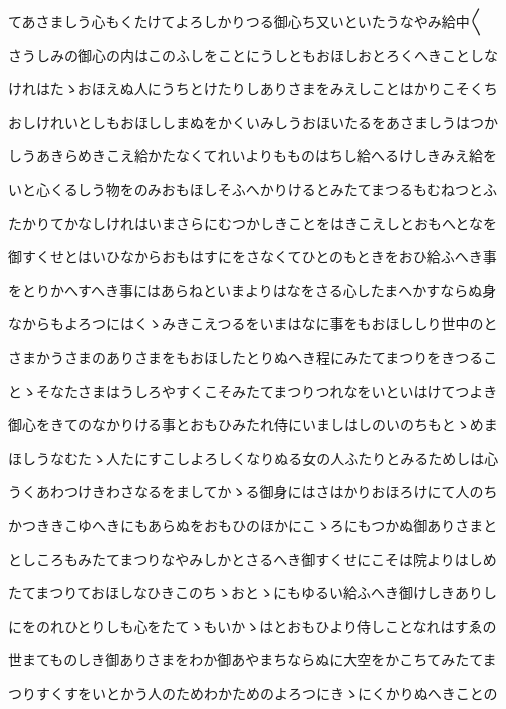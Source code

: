 \documentclass[a4paper,11pt,landscape]{ltjtarticle}
\begin{document}
てあさましう心もくたけてよろしかりつる御心ち又いといたうなやみ給中〱
\par\medskip
さうしみの御心の内はこのふしをことにうしともおほしおとろくへきことしな
\par\medskip
けれはたゝおほえぬ人にうちとけたりしありさまをみえしことはかりこそくち
\par\medskip
おしけれいとしもおほししまぬをかくいみしうおほいたるをあさましうはつか
\par\medskip
しうあきらめきこえ給かたなくてれいよりもものはちし給へるけしきみえ給を
\par\medskip
いと心くるしう物をのみおもほしそふへかりけるとみたてまつるもむねつとふ
\par\medskip
たかりてかなしけれはいまさらにむつかしきことをはきこえしとおもへとなを
\par\medskip
御すくせとはいひなからおもはすにをさなくてひとのもときをおひ給ふへき事
\par\medskip
をとりかへすへき事にはあらねといまよりはなをさる心したまへかすならぬ身
\par\medskip
なからもよろつにはくゝみきこえつるをいまはなに事をもおほししり世中のと
\par\medskip
さまかうさまのありさまをもおほしたとりぬへき程にみたてまつりをきつるこ
\par\medskip
とゝそなたさまはうしろやすくこそみたてまつりつれなをいといはけてつよき
\par\medskip
御心をきてのなかりける事とおもひみたれ侍にいましはしのいのちもとゝめま
\par\medskip
ほしうなむたゝ人たにすこしよろしくなりぬる女の人ふたりとみるためしは心
\par\medskip
うくあわつけきわさなるをましてかゝる御身にはさはかりおほろけにて人のち
\par\medskip
かつききこゆへきにもあらぬをおもひのほかにこゝろにもつかぬ御ありさまと
\par\medskip
としころもみたてまつりなやみしかとさるへき御すくせにこそは院よりはしめ
\par\medskip
たてまつりておほしなひきこのちゝおとゝにもゆるい給ふへき御けしきありし
\par\medskip
にをのれひとりしも心をたてゝもいかゝはとおもひより侍しことなれはすゑの
\par\medskip
世まてものしき御ありさまをわか御あやまちならぬに大空をかこちてみたてま
\par\medskip
つりすくすをいとかう人のためわかためのよろつにきゝにくかりぬへきことの
\par\medskip
\end{document}
